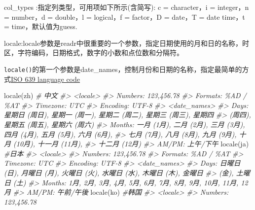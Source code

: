 \documentclass[
]{book}
\newenvironment{Shaded}{\begin{snugshade}}{\end{snugshade}}
\newcommand{\CommentTok}[1]{\textcolor[rgb]{0.56,0.35,0.01}{\textit{#1}}}
\newcommand{\FunctionTok}[1]{\textcolor[rgb]{0.00,0.00,0.00}{#1}}
\newcommand{\NormalTok}[1]{#1}
\newcommand{\StringTok}[1]{\textcolor[rgb]{0.31,0.60,0.02}{#1}}
\begin{document}
col\_types :指定列类型，可用项如下所示(含简写):
c = character，i = integer，n = number，d = double，l = logical，f = factor，D = date，T = date time，t = time，默认值为guess.

locale:locale参数是readr中很重要的一个参数，指定日期使用的月和日的名称，时区，字符编码，日期格式，数字的小数和点位数和分隔符。

\texttt{locale()}的第一个参数是date\_names，控制月份和日期的名称，指定最简单的方式\href{https://en.wikipedia.org/wiki/List_of_ISO_639-1_codes}{ISO 639 language code}

\begin{Shaded}
\begin{Highlighting}[]
\FunctionTok{locale}\NormalTok{(}\StringTok{\textquotesingle{}zh\textquotesingle{}}\NormalTok{) }\CommentTok{\# 中文}
\CommentTok{\#\textgreater{} \textless{}locale\textgreater{}}
\CommentTok{\#\textgreater{} Numbers:  123,456.78}
\CommentTok{\#\textgreater{} Formats:  \%AD / \%AT}
\CommentTok{\#\textgreater{} Timezone: UTC}
\CommentTok{\#\textgreater{} Encoding: UTF{-}8}
\CommentTok{\#\textgreater{} \textless{}date\_names\textgreater{}}
\CommentTok{\#\textgreater{} Days:   星期日 (周日), 星期一 (周一), 星期二 (周二), 星期三 (周三), 星期四}
\CommentTok{\#\textgreater{}         (周四), 星期五 (周五), 星期六 (周六)}
\CommentTok{\#\textgreater{} Months: 一月 (1月), 二月 (2月), 三月 (3月), 四月 (4月), 五月 (5月), 六月 (6月),}
\CommentTok{\#\textgreater{}         七月 (7月), 八月 (8月), 九月 (9月), 十月 (10月), 十一月 (11月),}
\CommentTok{\#\textgreater{}         十二月 (12月)}
\CommentTok{\#\textgreater{} AM/PM:  上午/下午}
\FunctionTok{locale}\NormalTok{(}\StringTok{\textquotesingle{}ja\textquotesingle{}}\NormalTok{) }\CommentTok{\#日本}
\CommentTok{\#\textgreater{} \textless{}locale\textgreater{}}
\CommentTok{\#\textgreater{} Numbers:  123,456.78}
\CommentTok{\#\textgreater{} Formats:  \%AD / \%AT}
\CommentTok{\#\textgreater{} Timezone: UTC}
\CommentTok{\#\textgreater{} Encoding: UTF{-}8}
\CommentTok{\#\textgreater{} \textless{}date\_names\textgreater{}}
\CommentTok{\#\textgreater{} Days:   日曜日 (日), 月曜日 (月), 火曜日 (火), 水曜日 (水), 木曜日 (木), 金曜日}
\CommentTok{\#\textgreater{}         (金), 土曜日 (土)}
\CommentTok{\#\textgreater{} Months: 1月, 2月, 3月, 4月, 5月, 6月, 7月, 8月, 9月, 10月, 11月, 12月}
\CommentTok{\#\textgreater{} AM/PM:  午前/午後}
\FunctionTok{locale}\NormalTok{(}\StringTok{\textquotesingle{}ko\textquotesingle{}}\NormalTok{) }\CommentTok{\#韩国}
\CommentTok{\#\textgreater{} \textless{}locale\textgreater{}}
\CommentTok{\#\textgreater{} Numbers:  123,456.78}

\end{Highlighting}
\end{Shaded}
\end{document}
